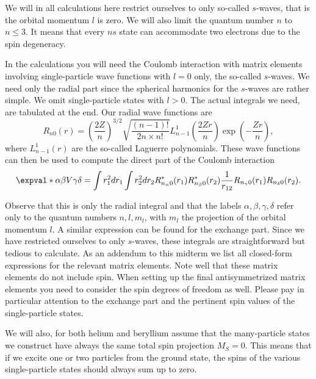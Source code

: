 \documentclass{article}
\begin{document}
We will in all calculations here restrict ourselves to only so-called \(s\)-waves, that is the orbital momentum \(l\) is zero.
We will also limit the quantum number \(n\) to \(n \le 3\).
It means that every \(ns\) state can accommodate two electrons due to the spin degeneracy.

In the calculations you will need the Coulomb interaction with matrix elements involving single-particle wave functions with \(l = 0\) only, the
so-called \(s\)-waves.
We need only the radial part since the spherical harmonics for the \(s\)-waves are rather simple.
We omit single-particle states with \(l > 0\).
The actual integrals we need, are tabulated at the end.
Our radial wave functions are
\begin{equation*}
    R_{n0}(r) = \left( \frac{2Z}{n} \right)^{3/2} \sqrt{\frac{(n-1)!}{2n\times n!}} L_{n-1}^1 \left( \frac{2Zr}{n} \right) \exp{\left( -\frac{Zr}{n} \right)},
\end{equation*}
where \(L_{n-1}^1(r)\) are the so-called Laguerre polynomials.
These wave functions can then be used to compute the direct part of the Coulomb interaction
\begin{equation*}
    \expval*{\alpha\beta}{V}{\gamma\delta} = \int r_1^2 dr_1 \int r_2^2 dr_2 R_{n_{\alpha} 0}^*(r_1) R_{n_{\beta} 0}^*(r_2) \frac{1}{r_{12}}R_{n_{\gamma} 0}(r_1) R_{n_{\delta} 0}(r_2).
\end{equation*}

Observe that this is only the radial integral and that the labels \( \alpha,\beta,\gamma,\delta \) refer only to the quantum numbers \(n,l,m_l\), with \(m_l\) the projection of the orbital momentum \(l\).
A similar expression can be found for the exchange part.
Since we have restricted ourselves to only \(s\)-waves, these integrals are straightforward but tedious to calculate.
As an addendum to this midterm we list all closed-form expressions for the relevant matrix elements.
Note well that these matrix elements do not include spin.
When setting up the final antisymmetrized matrix elements you need to consider the spin degrees of freedom as well.
Please pay in particular attention to the exchange part and the pertinent spin values of the single-particle states.

We will also, for both helium and beryllium assume that the many-particle states we construct have always the same total spin projection \(M_S = 0\).
This means that if we excite one or two particles from the ground state, the spins of the various single-particle states should always sum up to zero.
\end{document}
